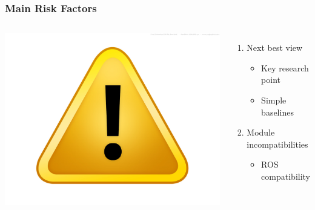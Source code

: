 
\begin{frame}[c] \frametitle{Main Risk Factors}

	\vfill

	\begin{columns}[c]
	
		\onslide<+->
		{
		\includegraphics[width=\linewidth]{./src/warning.jpg}
		}

		\onslide<+->
		{
		\begin{enumerate}\itemsep16pt
			
			\item Next best view
			\medskip
			\begin{itemize}\itemsep10pt
				\item Key research point
				\item Simple baselines 
			\end{itemize}
			\item Module incompatibilities
			\medskip
			\begin{itemize}\itemsep10pt
				\item ROS compatibility
			\end{itemize}
		\end{enumerate}
		}
	
	\end{columns}

	\vfill

\end{frame}